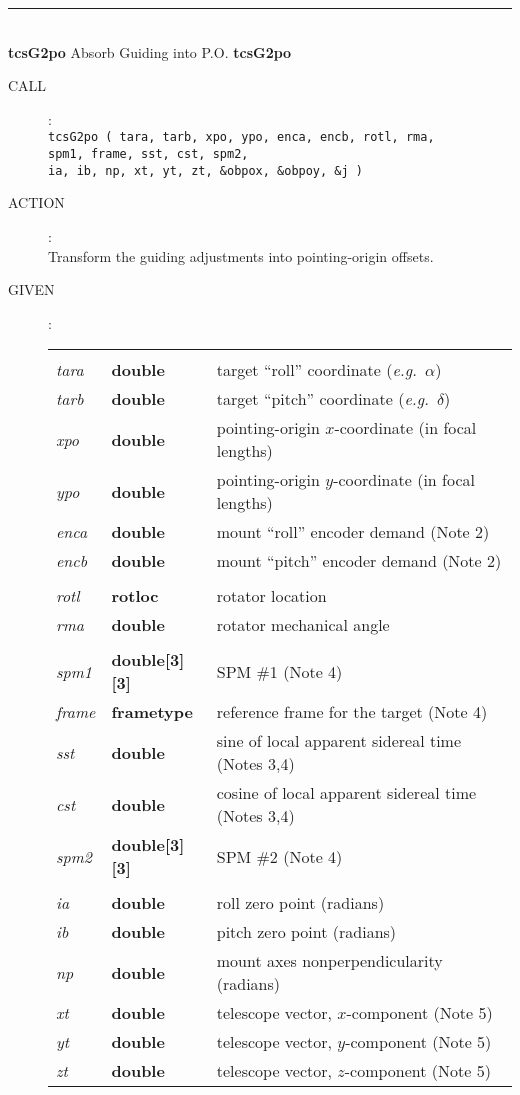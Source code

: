 \documentclass[12pt,fleqn,twoside]{article}
\renewcommand{\_}{{\tt\char'137}}     %
\newcommand{\routine}[2]
{
  \newpage
  \rule{\textwidth}{0.3mm}\\ \nopagebreak
  {\Large {\bf #1} \hfill #2 \hfill {\bf #1}}
  \vspace{-1ex}
}
\newcommand{\call}[1]
{
  \goodbreak
  \begin{description}
    \item[CALL]: \\[0.5ex] \nopagebreak
        {\tt #1}
  \end{description}
  \vspace{-3ex}
}
\newcommand{\action}[1]
{
  \goodbreak
  \begin{description}
    \item[ACTION]: \\[0.5ex] \nopagebreak
        #1
  \end{description}
  \vspace{-3ex}
}
\newcommand{\args}[2]
{
  \goodbreak
  \begin{description}
  \item[#1]: \\[1.5ex] \nopagebreak
    \hspace*{-0.9em}
    \begin{tabular}{p{4.5em}p{5.8em}p{23.5em}}
      #2
    \end{tabular}
  \end{description}
  \vspace{-3ex}
}
\newcommand{\specsubhead}[1]
{
  \multicolumn{3}{l}{\hspace*{-2em}{\sc #1~:}}
}
\newcommand{\spec}[3]
{
  {\em {#1}} & {\bf \mbox{#2}} & {#3}
}
\begin{document}
\routine{tcsG2po}{Absorb Guiding into P.O.}
\label{tcsG2po}
\call{tcsG2po ( tara, tarb, xpo, ypo, enca, encb, rotl, rma, \\
  \hspace*{4.6em} spm1, frame, sst, cst, spm2, \\
  \hspace*{4.6em} ia, ib, np, xt, yt, zt, \&obpox, \&obpoy, \&j )}
\action{Transform the guiding adjustments into pointing-origin offsets.}
\args{GIVEN}
{
\specsubhead{State before absorb operation} \\
\spec{tara}{double}{target ``roll'' coordinate ({\it e.g.}~$\alpha$)} \\
\spec{tarb}{double}{target ``pitch'' coordinate ({\it e.g.}~$\delta$)} \\
\spec{xpo}{double}{pointing-origin $x$-coordinate (in focal lengths)} \\
\spec{ypo}{double}{pointing-origin $y$-coordinate (in focal lengths)} \\
\spec{enca}{double}{mount ``roll'' encoder demand (Note 2)} \\
\spec{encb}{double}{mount ``pitch'' encoder demand (Note 2)} \\
\specsubhead{Rotator} \\
\spec{rotl}{\sc rotloc}{rotator location} \\
\spec{rma}{double}{rotator mechanical angle} \\
\specsubhead{Celestial transformation} \\
\spec{spm1}{double[3][3]}{SPM \#1 (Note 4)} \\
\spec{frame}{\sc frametype}{reference frame for the target (Note 4)} \\
\spec{sst}{double}{sine of local apparent sidereal time (Notes 3,4)} \\
\spec{cst}{double}{cosine of local apparent sidereal time (Notes 3,4)} \\
\spec{spm2}{double[3][3]}{SPM \#2 (Note 4)} \\
\specsubhead{Pointing model} \\
\spec{ia}{double}{roll zero point (radians)} \\
\spec{ib}{double}{pitch zero point (radians)} \\
\spec{np}{double}{mount axes nonperpendicularity (radians)} \\
\spec{xt}{double}{telescope vector, $x$-component (Note 5)} \\
\spec{yt}{double}{telescope vector, $y$-component (Note 5)} \\
\spec{zt}{double}{telescope vector, $z$-component (Note 5)}
}
\end{document}
